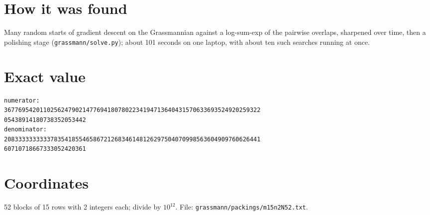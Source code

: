 \documentclass[11pt,a4paper]{article}
\begin{document}
\section{How it was found}
Many random starts of gradient descent on the Grassmannian against a log-sum-exp of the pairwise overlaps, sharpened over time, then a polishing stage (\texttt{grassmann/solve.py}); about 101 seconds on one laptop, with about ten such searches running at once.


\appendix
\section{Exact value}
{\small
\begin{verbatim}
numerator:
367769542011025624790214776941807802234194713640431570633693524920259322
05438914180738352053442
denominator:
208333333333378354185546586721268346148126297504070998563604909760626441
60710718667333052420361
\end{verbatim}}

\section{Coordinates}
52 blocks of 15 rows with 2 integers each; divide by $10^{12}$. File: \texttt{grassmann/packings/m15n2N52.txt}.
{\tiny
\begin{multicols}{4}
\end{multicols}}
\end{document}
